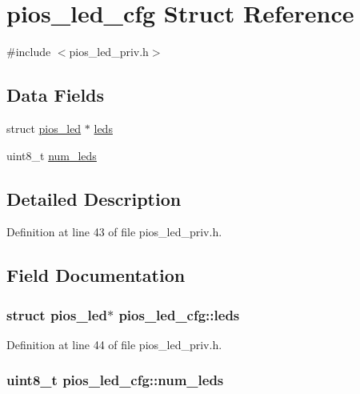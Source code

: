 \hypertarget{structpios__led__cfg}{\section{pios\-\_\-led\-\_\-cfg \-Struct \-Reference}
\label{structpios__led__cfg}
}


{\ttfamily \#include $<$pios\-\_\-led\-\_\-priv.\-h$>$}

\subsection*{\-Data \-Fields}
\begin{DoxyCompactItemize}
\item 
struct \hyperlink{structpios__led}{pios\-\_\-led} $\ast$ \hyperlink{structpios__led__cfg_a72aa7a241b8cc809461b9b9196cf3da0}{leds}
\item 
uint8\-\_\-t \hyperlink{structpios__led__cfg_a66071a8b465de9adeeb0c20ac329f21c}{num\-\_\-leds}
\end{DoxyCompactItemize}


\subsection{\-Detailed \-Description}


\-Definition at line 43 of file pios\-\_\-led\-\_\-priv.\-h.



\subsection{\-Field \-Documentation}
\hypertarget{structpios__led__cfg_a72aa7a241b8cc809461b9b9196cf3da0}{
\subsubsection[{leds}]{\setlength{\rightskip}{0pt plus 5cm}struct {\bf pios\-\_\-led}$\ast$ {\bf pios\-\_\-led\-\_\-cfg\-::leds}}}\label{structpios__led__cfg_a72aa7a241b8cc809461b9b9196cf3da0}


\-Definition at line 44 of file pios\-\_\-led\-\_\-priv.\-h.

\hypertarget{structpios__led__cfg_a66071a8b465de9adeeb0c20ac329f21c}{
\subsubsection[{num\-\_\-leds}]{\setlength{\rightskip}{0pt plus 5cm}uint8\-\_\-t {\bf pios\-\_\-led\-\_\-cfg\-::num\-\_\-leds}}}\label{structpios__led__cfg_a66071a8b465de9adeeb0c20ac329f21c}


